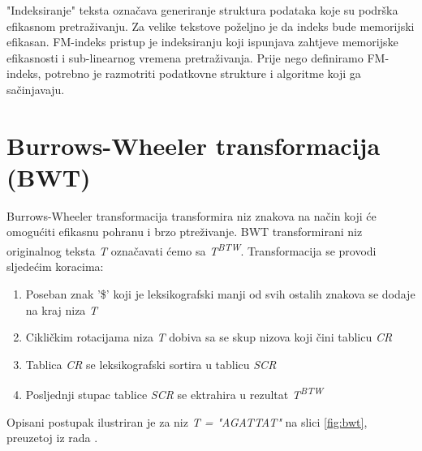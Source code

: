 \documentclass[times, utf8, seminar, numeric]{fer}
\begin{document}
"Indeksiranje" teksta označava generiranje struktura podataka koje su podrška efikasnom
pretraživanju. Za velike tekstove poželjno je da indeks bude memorijski efikasan.
FM-indeks \cite{Ferragina00opportunisticdata} pristup je indeksiranju koji ispunjava
zahtjeve memorijske efikasnosti i sub-linearnog vremena pretraživanja. Prije nego definiramo
FM-indeks, potrebno je razmotriti podatkovne strukture i algoritme koji ga sačinjavaju.

\section{Burrows-Wheeler transformacija (BWT)}

Burrows-Wheeler transformacija \cite{btw_1994} transformira niz znakova na način koji
će omogućiti efikasnu pohranu i brzo ptreživanje. BWT transformirani niz originalnog
teksta \textit{T} označavati ćemo sa \textit{T\textsuperscript{BTW}}. Transformacija se provodi sljedećim koracima:

\begin{enumerate}
  \item{Poseban znak '\$' koji je leksikografski manji od svih ostalih znakova se dodaje na kraj niza \textit{T}}
  \item{Cikličkim rotacijama niza \textit{T} dobiva sa se skup nizova koji čini tablicu \textit{CR} }
  \item{Tablica \textit{CR} se leksikografski sortira u tablicu \textit{SCR}}
  \item{Posljednji stupac tablice \textit{SCR} se ektrahira u rezultat \textit{T\textsuperscript{BTW}}}
\end{enumerate}

Opisani postupak ilustriran je za niz \textit{T = "AGATTAT"} na slici \ref{fig:bwt}, preuzetoj iz rada
\cite{singer_2012}.
\end{document}
